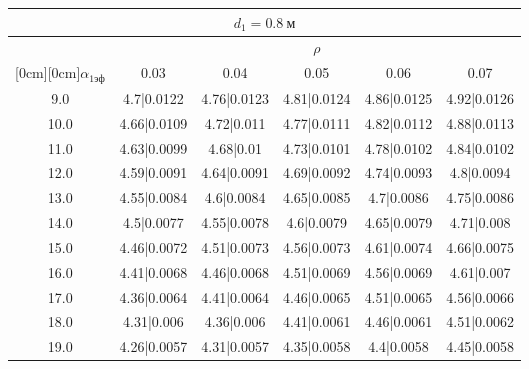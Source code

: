 \documentclass[20pt]{article}
\begin{document}
\begin{center}
\begin{tabular}{c|ccccc}
\hline
	\multicolumn{6}{c}{$d_{1}=0.8 \ м$} \\
\hline
	 & \multicolumn{5}{|c}{$\rho$} \\
	\cline{2-6}
	\raisebox{1.5ex}[0cm][0cm]{$\alpha_{1эф}$} & 0.03 & 0.04 & 0.05 & 0.06 & 0.07\\
\hline
	9.0 & 	4.7|0.0122 & 	4.76|0.0123 & 	4.81|0.0124 & 	4.86|0.0125 & 	4.92|0.0126\\
	10.0 & 	4.66|0.0109 & 	4.72|0.011 & 	4.77|0.0111 & 	4.82|0.0112 & 	4.88|0.0113\\
	11.0 & 	4.63|0.0099 & 	4.68|0.01 & 	4.73|0.0101 & 	4.78|0.0102 & 	4.84|0.0102\\
	12.0 & 	4.59|0.0091 & 	4.64|0.0091 & 	4.69|0.0092 & 	4.74|0.0093 & 	4.8|0.0094\\
	13.0 & 	4.55|0.0084 & 	4.6|0.0084 & 	4.65|0.0085 & 	4.7|0.0086 & 	4.75|0.0086\\
	14.0 & 	4.5|0.0077 & 	4.55|0.0078 & 	4.6|0.0079 & 	4.65|0.0079 & 	4.71|0.008\\
	15.0 & 	4.46|0.0072 & 	4.51|0.0073 & 	4.56|0.0073 & 	4.61|0.0074 & 	4.66|0.0075\\
	16.0 & 	4.41|0.0068 & 	4.46|0.0068 & 	4.51|0.0069 & 	4.56|0.0069 & 	4.61|0.007\\
	17.0 & 	4.36|0.0064 & 	4.41|0.0064 & 	4.46|0.0065 & 	4.51|0.0065 & 	4.56|0.0066\\
	18.0 & 	4.31|0.006 & 	4.36|0.006 & 	4.41|0.0061 & 	4.46|0.0061 & 	4.51|0.0062\\
	19.0 & 	4.26|0.0057 & 	4.31|0.0057 & 	4.35|0.0058 & 	4.4|0.0058 & 	4.45|0.0058\\
\end{tabular}


\end{center}
\end{document}
